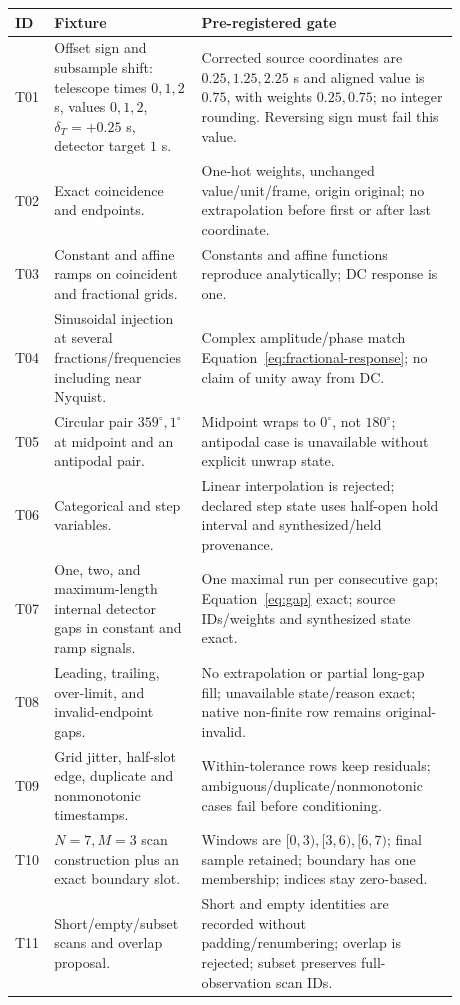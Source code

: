 \documentclass[11pt]{article}
\begin{document}
\begin{longtable}{L{0.055\linewidth}L{0.28\linewidth}L{0.55\linewidth}}
\toprule
ID & Fixture & Pre-registered gate\\
\midrule
T01 & Offset sign and subsample shift: telescope times \(0,1,2\) s, values \(0,1,2\), \(\delta_T=+0.25\) s, detector target \(1\) s. & Corrected source coordinates are \(0.25,1.25,2.25\) s and aligned value is \(0.75\), with weights \(0.25,0.75\); no integer rounding.  Reversing sign must fail this value.\\
T02 & Exact coincidence and endpoints. & One-hot weights, unchanged value/unit/frame, origin original; no extrapolation before first or after last coordinate.\\
T03 & Constant and affine ramps on coincident and fractional grids. & Constants and affine functions reproduce analytically; DC response is one.\\
T04 & Sinusoidal injection at several fractions/frequencies including near Nyquist. & Complex amplitude/phase match Equation~\eqref{eq:fractional-response}; no claim of unity away from DC.\\
T05 & Circular pair \(359^\circ,1^\circ\) at midpoint and an antipodal pair. & Midpoint wraps to \(0^\circ\), not \(180^\circ\); antipodal case is unavailable without explicit unwrap state.\\
T06 & Categorical and step variables. & Linear interpolation is rejected; declared step state uses half-open hold interval and synthesized/held provenance.\\
T07 & One, two, and maximum-length internal detector gaps in constant and ramp signals. & One maximal run per consecutive gap; Equation~\eqref{eq:gap} exact; source IDs/weights and synthesized state exact.\\
T08 & Leading, trailing, over-limit, and invalid-endpoint gaps. & No extrapolation or partial long-gap fill; unavailable state/reason exact; native non-finite row remains original-invalid.\\
T09 & Grid jitter, half-slot edge, duplicate and nonmonotonic timestamps. & Within-tolerance rows keep residuals; ambiguous/duplicate/nonmonotonic cases fail before conditioning.\\
T10 & \(N=7,M=3\) scan construction plus an exact boundary slot. & Windows are \([0,3),[3,6),[6,7)\); final sample retained; boundary has one membership; indices stay zero-based.\\
T11 & Short/empty/subset scans and overlap proposal. & Short and empty identities are recorded without padding/renumbering; overlap is rejected; subset preserves full-observation scan IDs.\\

\end{longtable}
\end{document}
